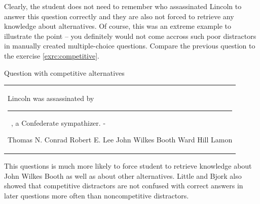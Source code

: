 \documentclass[12pt, twoside]{fithesis2}		%
\renewcommand{\_}{\leavevmode \kern0.07em\vbox{\hrule width0.4em}}
\newcounter{choice}
\renewcommand\thechoice{\Alph{choice}}
\newcommand\choicelabel{\thechoice.}
\newenvironment{choices}%
  {\vspace{0.8em}\list{\choicelabel}%
     {\usecounter{choice}\def\makelabel##1{\hss\llap{##1}}%
       \settowidth{\leftmargin}{W.\hskip\labelsep\hskip 0.01em}%
       \def\choice{%
         \item
       } %
       \labelwidth\leftmargin\advance\labelwidth-\labelsep
       \topsep=0pt
       \partopsep=0pt
     }%
  }%
  {\vspace{-0.7em}\endlist}
\newenvironment{question}
{
  \begin{center}
  \vspace{-0.5em}
  \begin{tabular}{p{0.9\textwidth}}
}
{
  \\
  \end{tabular}
  \vspace{-1em}
  \end{center}
}
\newcommand{\sentenceGap}{\rule{1.5cm}{0.4pt}~}
\begin{document}
\noindent
Clearly, the student does not need to remember who assassinated Lincoln to answer this question correctly and they are also not forced to retrieve any knowledge about alternatives.
Of course, this was an extreme example to illustrate the point -- you definitely would not come accross such poor distractors in manually created multiple-choice questions.
Compare the previous question to the exercise \ref{exrc:competitive}.
\begin{exercise}
\caption{Question with competitive alternatives}\label{exrc:competitive}
  \begin{question}
  Lincoln was assassinated by \sentenceGap , a Confederate sympathizer.
  \begin{choices}
    \choice Thomas N. Conrad
    \choice Robert E. Lee
    \choice John Wilkes Booth
    \choice Ward Hill Lamon
  \end{choices}
  \end{question}
\end{exercise}

\noindent
This questions is much more likely to force student to retrieve knowledge about John Wilkes Booth as well as about other alternatives.
Little and Bjork also showed that competitive distractors are not confused with correct answers in later questions more often than noncompetitive distractors.
\end{document}
